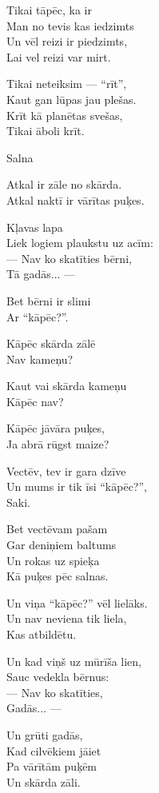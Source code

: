 \documentclass[14pt]{extarticle}
\begin{document}
Tikai tāpēc, ka ir\\
Man no tevis kas iedzimts\\
Un vēl reizi ir piedzimts,\\
Lai vel reizi var mirt.

Tikai neteiksim --- ``rīt'',\\
Kaut gan lūpas jau plešas.\\
Krīt kā planētas svešas,\\
Tikai āboli krīt.


\newpage

{\large \sc Salna}

Atkal ir zāle no skārda.\\
Atkal naktī ir vārītas puķes.

Kļavas lapa\\
Liek logiem plaukstu uz acīm:\\
--- Nav ko skatīties bērni,\\
Tā gadās... ---

Bet bērni ir slimi\\
Ar ``kāpēc?''.

Kāpēc skārda zālē\\
Nav kameņu?

Kaut vai skārda kameņu\\
Kāpēc nav?

Kāpēc jāvāra puķes,\\
Ja abrā rūgst maize?

Vectēv, tev ir gara dzīve\\
Un mums ir tik īsi ``kāpēc?'',\\
Saki.

Bet vectēvam pašam\\
Gar deniņiem baltums\\
Un rokas uz spieķa\\
Kā puķes pēc salnas.

Un viņa ``kāpēc?'' vēl lielāks.\\
Un nav neviena tik liela,\\
Kas atbildētu.

Un kad viņš uz mūrīša lien,\\
Sauc vedekla bērnus:\\
--- Nav ko skatīties,\\
Gadās... ---

Un grūti gadās,\\
Kad cilvēkiem jāiet\\
Pa vārītām puķēm\\
Un skārda zāli.
\end{document}
